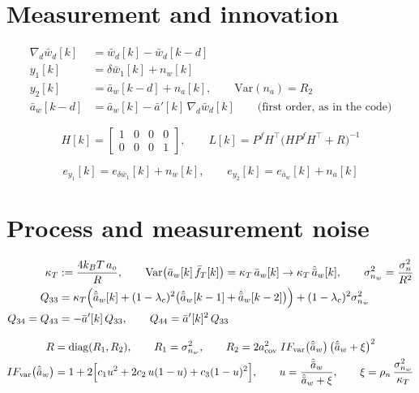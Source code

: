 \documentclass[11pt,a4paper,fontset=none]{ctexart}
\newcommand{\ba}{\bar{a}}
\newcommand{\bw}{\bar{w}}
\begin{document}
\section{Measurement and innovation}

\begin{align*}
\nabla_d\bw_d[k] &= \bw_d[k] - \bw_d[k-d] \\
y_1[k] &= \delta\bw_1[k] + n_w[k] \\
y_2[k] &= \ba_w[k-d] + n_a[k] , \qquad \mathrm{Var}(n_a) = R_2 \\
\ba_w[k-d] &= \ba_w[k] - \ba'[k]\,\nabla_d\bw_d[k] \qquad \text{(first order, as in the code)}
\end{align*}

\begin{equation*}
H[k] =
\begin{bmatrix}
1 & 0 & 0 & 0 \\
0 & 0 & 0 & 1
\end{bmatrix} ,
\qquad
L[k] = P^f H^{\top}\bigl(HP^fH^{\top}+R\bigr)^{-1}
\end{equation*}

\begin{equation*}
e_{y_1}[k] = e_{\delta\bw_1}[k] + n_w[k] , \qquad
e_{y_2}[k] = e_{\ba_w}[k] + n_a[k]
\end{equation*}

\section{Process and measurement noise}

\begin{align*}
\kappa_T &:= \frac{4k_BT\,a_o}{R} , \qquad
\mathrm{Var}\bigl(\ba_w[k]\,\bar{f}_T[k]\bigr) = \kappa_T\,\ba_w[k] \to \kappa_T\,\hat{\ba}_w[k] , \qquad
\sigma^{2}_{n_w} = \frac{\sigma^{2}_{n}}{R^{2}} \\
Q_{33} &= \kappa_T\Bigl(\hat{\ba}_w[k]
  + (1-\lambda_c)^{2}\bigl(\hat{\ba}_w[k-1] + \hat{\ba}_w[k-2]\bigr)\Bigr)
  + (1-\lambda_c)^{2}\sigma^{2}_{n_w} \\
Q_{34} = Q_{43} &= -\ba'[k]\,Q_{33} , \qquad
Q_{44} = \ba'[k]^{2}\,Q_{33}
\end{align*}

\begin{align*}
R   &= \mathrm{diag}(R_1, R_2) , \qquad R_1 = \sigma^{2}_{n_w} , \qquad
R_2 = 2a_{\mathrm{cov}}^{2}\;IF_{\mathrm{var}}\bigl(\hat{\ba}_w\bigr)\,\bigl(\hat{\ba}_w + \xi\bigr)^{2} \\
IF_{\mathrm{var}}\bigl(\hat{\ba}_w\bigr)
    &= 1 + 2\Bigl[c_1 u^{2} + 2c_2\,u(1-u) + c_3(1-u)^{2}\Bigr] ,
       \qquad u = \frac{\hat{\ba}_w}{\hat{\ba}_w + \xi} , \qquad
\xi = \rho_n\,\frac{\sigma^{2}_{n_w}}{\kappa_T}
\end{align*}
\end{document}
